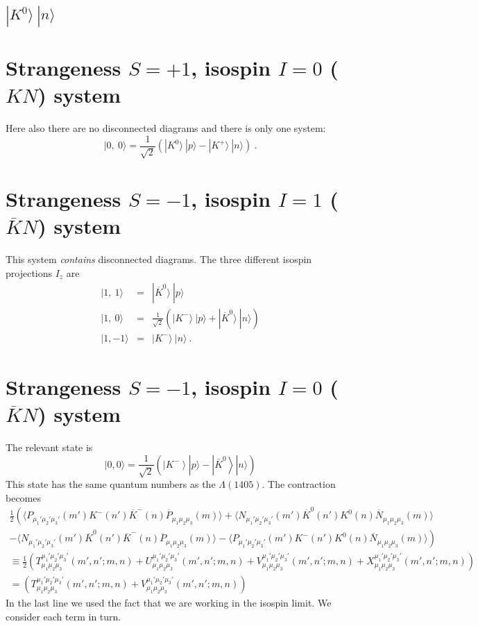 \documentclass[%
 preprint,
nofootinbib,
 amsmath,amssymb,
 aps,
]{revtex4-2}
\begin{document}
\subsection{$|K^0\rangle\ |n\rangle$}
\section{Strangeness $S=+1$, isospin $I=0$ ($KN$) system}
Here also there are no disconnected diagrams and there is only one system:
\begin{displaymath}
|0,\ 0\rangle=\frac{1}{\sqrt{2}}\left(|K^0\rangle\ |p\rangle - |K^+\rangle\ |n\rangle\right)\ .
\end{displaymath}



\section{Strangeness $S=-1$, isospin $I=1$ ($\overline{K}N$) system}
This system \emph{contains} disconnected diagrams.  The three different isospin projections $I_z$ are
\begin{eqnarray*}
|1,\ 1\rangle&=&|\overline{K}^0\rangle\ |p\rangle\\
|1,\ 0\rangle&=&\frac{1}{\sqrt{2}}\left(|K^-\rangle\ |p\rangle + |\overline{K}^0\rangle\ |n\rangle \right)\\
|1,-1\rangle&=&|K^-\rangle\ |n\rangle\ .
\end{eqnarray*}

\section{Strangeness $S=-1$, isospin $I=0$ ($\overline{K}N$) system}
The relevant state is
\begin{displaymath}
|0,0\rangle=\frac{1}{\sqrt{2}}\left(\left|K^{-}\right\rangle|p\rangle-\left|\bar{K}^{0}\right\rangle|n\rangle\right)
\end{displaymath}
This state has the same quantum numbers as the $\Lambda(1405)$.  The contraction becomes
{\footnotesize
\begin{multline}
\frac{1}{2}\left(\langle P_{\mu_1'\mu_2'\mu_3'}(m')K^-(n')\overline{K}^-(n)\overline{P}_{\mu_1\mu_2\mu_3}(m)\rangle
+
\langle N_{\mu_1'\mu_2'\mu_3'}(m')\overline{K}^0(n')K^0(n)\overline{N}_{\mu_1\mu_2\mu_3}(m)\rangle
\right.\\
-\left.
\langle N_{\mu_1'\mu_2'\mu_3'}(m')\overline{K}^0(n')\overline{K}^-(n)\overline{P}_{\mu_1\mu_2\mu_3}(m)\rangle
-
\langle P_{\mu_1'\mu_2'\mu_3'}(m')K^-(n')K^0(n)\overline{N}_{\mu_1\mu_2\mu_3}(m)\rangle
\right)\\
\equiv
\frac{1}{2}\left(
T^{\mu_1'\mu_2'\mu_3'}_{\mu_1\mu_2\mu_3}(m',n';m,n)
+ U^{\mu_1'\mu_2'\mu_3'}_{\mu_1\mu_2\mu_3}(m',n';m,n)
+ V^{\mu_1'\mu_2'\mu_3'}_{\mu_1\mu_2\mu_3}(m',n';m,n)
+ X^{\mu_1'\mu_2'\mu_3'}_{\mu_1\mu_2\mu_3}(m',n';m,n)
\right)\\
=\left(T^{\mu_1'\mu_2'\mu_3'}_{\mu_1\mu_2\mu_3}(m',n';m,n)+V^{\mu_1'\mu_2'\mu_3'}_{\mu_1\mu_2\mu_3}(m',n';m,n)\right)
\end{multline}
}In the last line we used the fact that we are working in the isospin limit.  We consider each term in turn.
\end{document}
